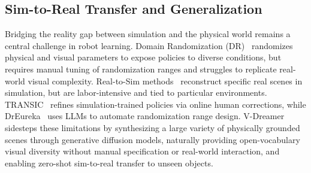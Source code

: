 \subsection{Sim-to-Real Transfer and Generalization}
Bridging the reality gap between simulation and the physical world remains a central challenge in robot learning. Domain Randomization (DR)~\cite{tobin2017domain, peng2018sim} randomizes physical and visual parameters to expose policies to diverse conditions, but requires manual tuning of randomization ranges and struggles to replicate real-world visual complexity. Real-to-Sim methods~\cite{zhang2023real2sim, torne2024rialto} reconstruct specific real scenes in simulation, but are labor-intensive and tied to particular environments. TRANSIC~\cite{jiang2023transic} refines simulation-trained policies via online human corrections, while DrEureka~\cite{ma2024dreureka} uses LLMs to automate randomization range design. V-Dreamer sidesteps these limitations by synthesizing a large variety of physically grounded scenes through generative diffusion models, naturally providing open-vocabulary visual diversity without manual specification or real-world interaction, and enabling zero-shot sim-to-real transfer to unseen objects.